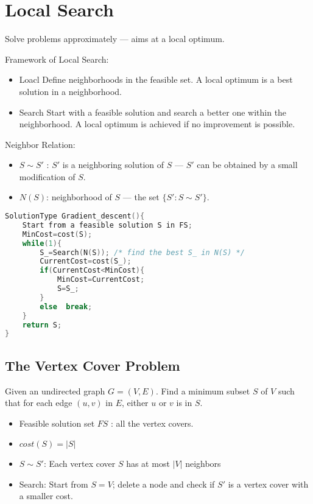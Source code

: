 \newpage
\section{Local Search}
Solve problems approximately --- aims at a local optimum. 

Framework of Local Search:
\begin{itemize}\small
    \item Loacl 
    \subitem Define neighborhoods in the feasible set. 
    \subitem A local optimum is a best solution in a neighborhood. 
    \item Search 
    \subitem Start with a feasible solution and search a better one within the neighborhood. 
    \subitem A local optimum is achieved if no improvement is possible. 
\end{itemize}

Neighbor Relation:
\begin{itemize}\small
    \item  $S \sim S'$ : $S'$ is a neighboring solution of $S$ --- $S'$ can be obtained by a small modification of $S$.
    \item  $N(S)$: neighborhood of $S$ --- the set $\{ S': S \sim S' \}$.
\end{itemize}
\begin{lstlisting}[language={c++}]
SolutionType Gradient_descent(){
    Start from a feasible solution S in FS;
    MinCost=cost(S);
    while(1){
        S_=Search(N(S)); /* find the best S_ in N(S) */
        CurrentCost=cost(S_);
        if(CurrentCost<MinCost){
            MinCost=CurrentCost;    
            S=S_;
        }
        else  break;
    }
    return S;
}
\end{lstlisting}

\subsection{The Vertex Cover Problem}
Given an undirected graph $G = (V, E)$. Find a minimum subset $S$ of $V$ such that for each edge $(u, v)$ in $E$, either $u$ or $v$  is in $S$.

\begin{itemize}
    \item Feasible solution set $FS$ : all the vertex covers. 
    \item $cost(S)=|S|$
    \item $S\sim S'$: Each vertex cover $S$ has at most $|V|$ neighbors
    \item Search: Start from $S = V$; delete a node and check if $S'$ is a vertex cover with a smaller cost.
\end{itemize}

